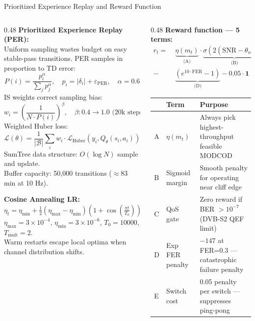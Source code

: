 \documentclass[aspectratio=169,10pt]{beamer}
\begin{document}
\begin{frame}[fragile,shrink=15]{Prioritized Experience Replay and Reward Function}
  \begin{columns}[T]
    \begin{column}{0.48\textwidth}
      \textbf{Prioritized Experience Replay (PER):}\\
      \scriptsize Uniform sampling wastes budget on easy stable-pass transitions.
      PER samples in proportion to TD error:
      \[P(i)=\frac{p_i^\alpha}{\sum_j p_j^\alpha},\quad p_i=|\delta_i|+\varepsilon_\text{PER},\quad\alpha=0.6\]
      IS weights correct sampling bias:
      \[w_i=\left(\frac{1}{N\cdot P(i)}\right)^\beta,\quad\beta:0.4\to1.0\text{ (20k steps)}\]
      Weighted Huber loss:
      \[\mathcal{L}(\theta)=\frac{1}{|\mathcal{B}|}\sum_i w_i\cdot\mathcal{L}_\text{Huber}(y_i,Q_\theta(s_i,a_i))\]
      SumTree data structure: $O(\log N)$ sample and update.\\
      Buffer capacity: 50,000 transitions ($\approx$83 min at 10 Hz).

      \vspace{0.3em}
      \textbf{Cosine Annealing LR:}
      \[\eta_t=\eta_\text{min}+\tfrac{1}{2}(\eta_\text{max}-\eta_\text{min})\left(1+\cos\!\left(\tfrac{\pi t}{T_0}\right)\right)\]
      $\eta_\text{max}=3\times10^{-4}$, $\eta_\text{min}=3\times10^{-6}$, $T_0=10000$, $T_\text{mult}=2$.\\
      Warm restarts escape local optima when channel distribution shifts.
    \end{column}
    \begin{column}{0.48\textwidth}
      \textbf{Reward function — 5 terms:}
      \begin{align*}
        r_t =\; &\underbrace{\eta(m_t)}_{\text{(A)}}\cdot
                 \underbrace{\sigma(2(\text{SNR}-\theta_{m_t}))}_{\text{(B)}}\cdot
                 \underbrace{\mathbf{1}[\text{BER}<10^{-7}]}_{\text{(C)}}\\
               -\;&\underbrace{(e^{10\cdot\text{FER}}-1)}_{\text{(D)}}
                 -\underbrace{0.05\cdot\mathbf{1}[m_t\neq m_{t-1}]}_{\text{(E)}}
      \end{align*}
      {\scriptsize
      \begin{tabular}{p{0.3cm}p{1.4cm}p{3.5cm}}
        \toprule
        \textbf{} & \textbf{Term} & \textbf{Purpose}\\
        \midrule
        A & $\eta(m_t)$ & Always pick highest-throughput feasible MODCOD\\
        B & Sigmoid margin & Smooth penalty for operating near cliff edge\\
        C & QoS gate & Zero reward if BER $>10^{-7}$ (DVB-S2 QEF limit)\\
        D & Exp FER penalty & $-147$ at FER=0.3 — catastrophic failure penalty\\
        E & Switch cost & 0.05 penalty per switch — suppresses ping-pong\\
        \bottomrule
      \end{tabular}}


\end{column}
\end{columns}
\end{frame}
\end{document}
